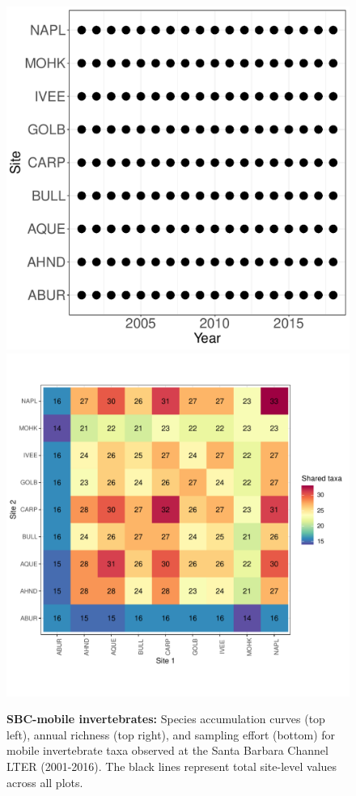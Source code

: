\documentclass[11pt, oneside]{article}
\begin{document}
\begin{figure}[h!]
\includegraphics[scale = 0.4]{sbc-mobileInverts-castorani_spatiotemporal_sampling_effort.pdf}
\includegraphics[scale = 0.4]{sbc-mobileInverts-castorani_spp_shared.pdf}
\caption{{\bf SBC-mobile invertebrates:} Species accumulation curves (top left),  annual richness (top right), and sampling effort (bottom)  for mobile invertebrate taxa observed at  the Santa Barbara Channel LTER (2001-2016). The black lines represent total site-level values across all plots.}
\label{sbc-mobileInverts}
\end{figure}
\end{document}
